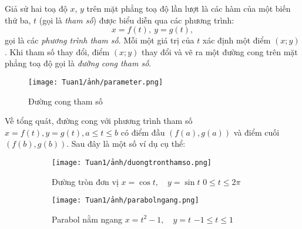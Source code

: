 \begin{definition}
    Giả sử hai toạ độ $x$, $y$ trên mặt phẳng toạ độ lần lượt là các hàm của một biến thứ ba, $t$ (gọi là \emph{tham số}) được biểu diễn qua các phương trình:
     \begin{equation*}   x=f(t),\ y=g(t),
\end{equation*}
    gọi là các \emph{phương trình tham số}. Mỗi một giá trị của $t$ xác định một điểm $(x;y)$. Khi tham số thay đổi, điểm $(x;y)$ thay đổi và vẽ ra một đường cong trên mặt phẳng toạ độ gọi là \emph{đường cong tham số}.
\end{definition}


\newpage

\begin{figure}[!htbp]
    \centering
    \texttt{[image: Tuan1/ảnh/parameter.png]}
    \caption{Đường cong tham số}
    \label{fig:phuongtrinhthamso}   
\end{figure}    
\vspace{-0.5em}
Về tổng quát, đường cong với phương trình tham số $x=f(t), y=g(t), a\leq t\leq b$ có điểm đầu $(f(a),g(a))$ và điểm cuối $(f(b),g(b))$. \newline Sau đây là một số ví dụ cụ thể:
\vspace{-1.75em}
\begin{figure}[H]
    \centering
    \begin{subfigure}{0.45\textwidth}
        \texttt{[image: Tuan1/ảnh/duongtronthamso.png]}
        \caption{ Đường tròn đơn vị \newline\hspace*{1em} \(x=\cos t,\quad y=\sin t\)\newline \hspace*{1em} \(0\leq t\leq 2\pi\)}
    \end{subfigure}
    \hspace{\fill}
    \begin{subfigure}{0.45\textwidth}
        \texttt{[image: Tuan1/ảnh/parabolngang.png]}
        \caption{Parabol nằm ngang \newline\hspace*{1em}\(x=t^2 -1,\quad y=t\)\newline\hspace*{1em} \(-1\leq t\leq 1\)}
    \end{subfigure}
    \caption{}
\end{figure}


